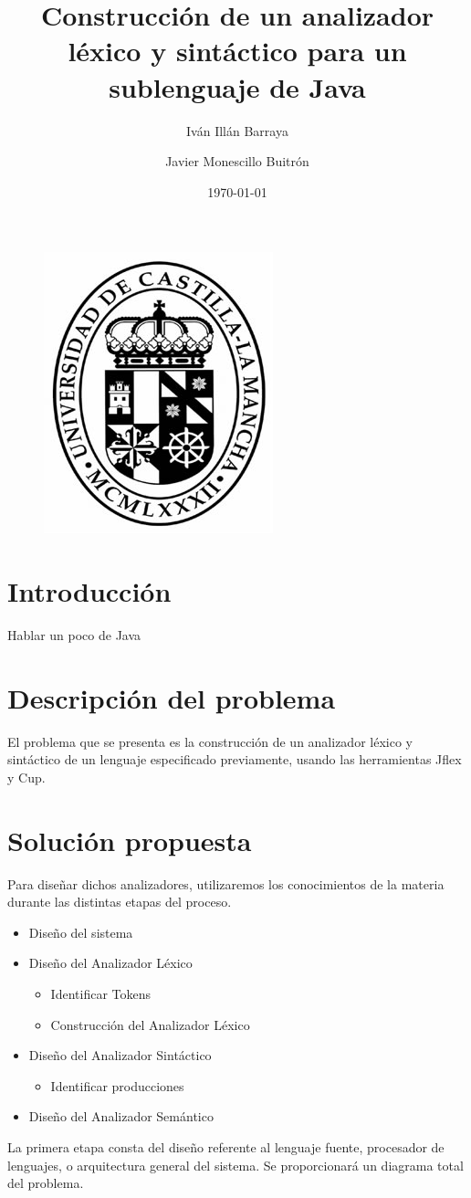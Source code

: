 \documentclass[12pt,a4paper]{article}
\author{ Iván Illán Barraya \and Javier Monescillo Buitrón}
\title{Construcción de un analizador léxico y sintáctico para un sublenguaje de Java}
\date{\today}
\begin{document}
	
	\maketitle
	
	\begin{figure}[h]
		\centering
		\includegraphics[width=0.25
		\linewidth]{img/uclm}
		\caption{}
		\label{fig:image004}
	\end{figure}

	\newpage
	\tableofcontents
	\newpage
	
\section{Introducción}
Hablar un poco de Java

\section{Descripción del problema}
El problema que se presenta es la construcción de un analizador léxico y sintáctico de un lenguaje especificado previamente, usando las herramientas Jflex y Cup.

\section{Solución propuesta}
Para diseñar dichos analizadores, utilizaremos los conocimientos de la materia durante las distintas etapas del proceso.

\begin{itemize}
	\item Diseño del sistema
	\item Diseño del Analizador Léxico  \begin{itemize}
		\item Identificar Tokens
		\item Construcción del Analizador Léxico
	\end{itemize}
	
	\item Diseño del Analizador Sintáctico  \begin{itemize}
		\item Identificar producciones
	\end{itemize}
	\item Diseño del Analizador Semántico
	
\end{itemize}
La primera etapa consta del diseño referente al lenguaje fuente, procesador de lenguajes, o arquitectura general del sistema. Se proporcionará un diagrama total del problema.
\end{document}
